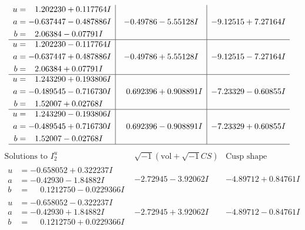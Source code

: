 \documentclass[1p]{elsarticle_modified}
\theoremstyle{definition}
\newcommand{\I}{\sqrt{-1}}
\begin{document}
$$\begin{array}{c|c|c}
\begin{aligned}
u &= \phantom{-}1.202230 + 0.117764 I \\
a &= -0.637447 - 0.487886 I \\
b &= \phantom{-}2.06384 - 0.07791 I\end{aligned}
 & -0.49786 - 5.55128 I & -9.12515 + 7.27164 I \\ \hline\begin{aligned}
u &= \phantom{-}1.202230 - 0.117764 I \\
a &= -0.637447 + 0.487886 I \\
b &= \phantom{-}2.06384 + 0.07791 I\end{aligned}
 & -0.49786 + 5.55128 I & -9.12515 - 7.27164 I \\ \hline\begin{aligned}
u &= \phantom{-}1.243290 + 0.193806 I \\
a &= -0.489545 - 0.716730 I \\
b &= \phantom{-}1.52007 + 0.02768 I\end{aligned}
 & \phantom{-}0.692396 + 0.908891 I & -7.23329 - 0.60855 I \\ \hline\begin{aligned}
u &= \phantom{-}1.243290 - 0.193806 I \\
a &= -0.489545 + 0.716730 I \\
b &= \phantom{-}1.52007 - 0.02768 I\end{aligned}
 & \phantom{-}0.692396 - 0.908891 I & -7.23329 + 0.60855 I\\
 \hline 
 \end{array}$$\newpage$$\begin{array}{c|c|c}  
\text{Solutions to }I^u_{2}& \I (\text{vol} + \sqrt{-1}CS) & \text{Cusp shape}\\
 \hline 
\begin{aligned}
u &= -0.658052 + 0.322237 I \\
a &= -0.42930 - 1.84882 I \\
b &= \phantom{-}0.1212750 - 0.0229366 I\end{aligned}
 & -2.72945 - 3.92062 I & -4.89712 + 0.84761 I \\ \hline\begin{aligned}
u &= -0.658052 - 0.322237 I \\
a &= -0.42930 + 1.84882 I \\
b &= \phantom{-}0.1212750 + 0.0229366 I\end{aligned}
 & -2.72945 + 3.92062 I & -4.89712 - 0.84761 I \\ \hline\begin{aligned}

\end{aligned}
\end{array}$$
\end{document}

